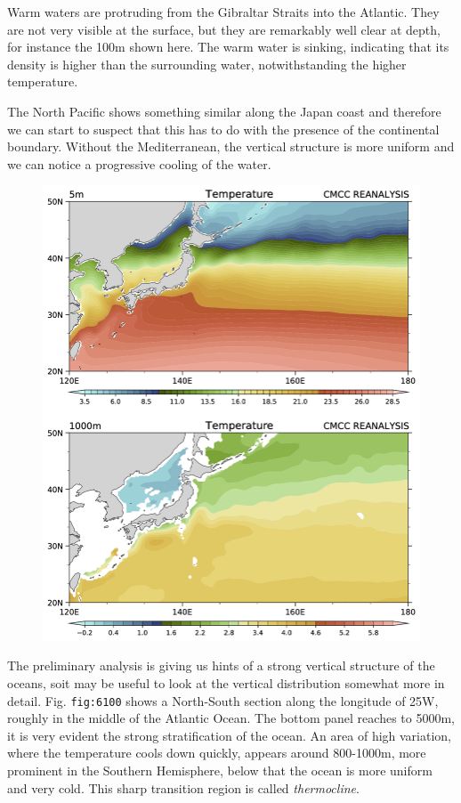 Warm waters are protruding from the Gibraltar Straits into the Atlantic.
They are not very visible at the surface, but they are remarkably well
clear at depth, for instance the 100m shown here. The warm water is
sinking, indicating that its density is higher than the surrounding
water, notwithstanding the higher temperature.

The North Pacific shows something similar along the Japan coast and
therefore we can start to suspect that this has to do with the presence
of the continental boundary. Without the Mediterranean, the vertical
structure is more uniform and we can notice a progressive cooling of the
water.

\begin{figure}
\centering
\includegraphics[width = .7 \textwidth]{figs/GD/Kur1000.png}
\caption{} \label{fig:}
\end{figure}

The preliminary analysis is giving us hints of a strong vertical
structure of the oceans, soit may be useful to look at the vertical
distribution somewhat more in detail. Fig. \texttt{fig:6100} shows a
North-South section along the longitude of 25W, roughly in the middle of
the Atlantic Ocean. The bottom panel reaches to 5000m, it is very
evident the strong stratification of the ocean. An area of high
variation, where the temperature cools down quickly, appears around
800-1000m, more prominent in the Southern Hemisphere, below that the
ocean is more uniform and very cold. This sharp transition region is
called \emph{thermocline}.

